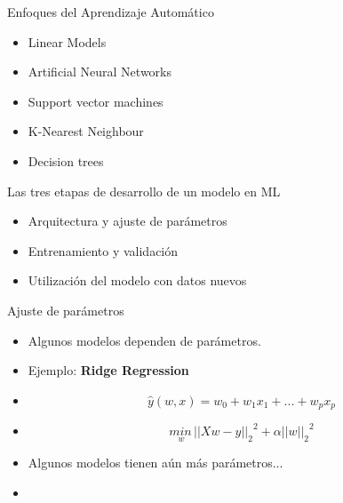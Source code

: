 \documentclass[10pt]{beamer}
\begin{document}
\begin{frame}{Enfoques del Aprendizaje Automático}


  \begin{itemize}[<+->]
  \item Linear Models
  \item Artificial Neural Networks
  \item Support vector machines
  \item K-Nearest Neighbour
  \item Decision trees
  \end{itemize}

\end{frame}

\begin{frame}{Las tres etapas de desarrollo de un modelo en ML}
  \begin{itemize}[<+->]
  \item Arquitectura y ajuste de parámetros
  \item Entrenamiento y validación 
  \item Utilización del modelo con datos nuevos
  \end{itemize}
\end{frame}


\begin{frame}{Ajuste de parámetros}
  \begin{itemize}[<+->]
  \item Algunos modelos dependen de parámetros.

  \item Ejemplo: \textbf{Ridge Regression}

  \item[] $$\hat{y}(w, x) = w_0 + w_1 x_1 + ... + w_p x_p$$

  \item[] $$\underset{w}{min\,}{{||X w - y||_2}}^2 + \alpha{||w||_2}^2$$

  \item Algunos modelos tienen aún más parámetros...

  \item[] \lstI

  \end{itemize}

\end{frame}
\end{document}
